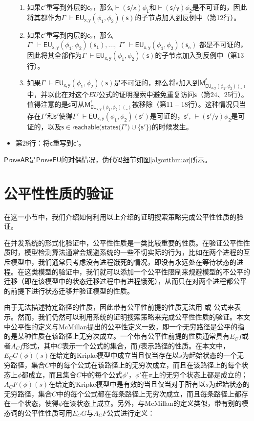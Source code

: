 \begin{itemize}
\begin{enumerate}
		\item 如果$\mathsf{c'}$重写到外层的$\mathsf{c_2}$，那么$\mathsf{\vdash (s/x)\phi_1}$和$\mathsf{\vdash (s/y)\phi_2}$是不可证的，因此将其都作为$\Gamma\;\mathsf{\vdash EU_{x,y}(\phi_1,\phi_2)(s)}$的子节点加入到反例中（第12行）。
		\item 如果$\mathsf{c'}$重写到内层的$\mathsf{c_2}$，那么$\Gamma'\;\mathsf{\vdash EU_{x,y}(\phi_1,\phi_2)(s_1)},...,\;\Gamma'\;\mathsf{\vdash EU_{x,y}(\phi_1,\phi_2)(s_n)}$ 都是不可证的，因此将其全部作为$\Gamma\;\mathsf{\vdash EU_{x,y}(\phi_1,\phi_2)(s)}$的子节点加入到反例中（第13行）。
		\item 如果$\Gamma\;\mathsf{\vdash EU_{x,y}(\phi_1,\phi_2)(s)}$是不可证的，那么将$s$加入到$\mathsf{M_{EU_{x,y}(\phi_1,\phi_2)(\_)}^f}$中，并以此在对这个$EU$公式的证明搜索中避免重复访问$\mathsf{s}$（第24、25行）。值得注意的是$\mathsf{s}$可从$\mathsf{M_{EU_{x,y}(\phi_1,\phi_2)(\_)}^f}$被移除（第11 -- 18行）。这种情况只当存在${\Gamma'}$和$\mathsf{s'}$使得$\Gamma'\;\mathsf{\vdash EU_{x,y}(\phi_1,\phi_2)(s')}$是可证的，$\mathsf{s'}$, $\mathsf{\vdash (s'/y)\phi_2}$是可证的，以及$\mathsf{s\in reachable(states(}\Gamma'\mathsf{)\cup \{s'\})}$的时候发生。
	\end{enumerate}
	\item 第28行：将$\mathsf{c}$重写到$\mathsf{c'}$。
\end{itemize}

$\mathsf{ProveAR}$是$\mathsf{ProveEU}$的对偶情况，伪代码细节如图\ref{algorithm:ar}所示。

\section{公平性性质的验证}
在这一小节中，我们介绍如何利用以上介绍的证明搜索策略完成公平性性质的验证。

在并发系统的形式化验证中，公平性性质是一类比较重要的性质。在验证公平性性质时，模型检测算法通常会规避系统的一些不切实际的行为\cite{BaierKatoen08}，比如在两个进程的互斥模型中，我们通常只考虑没有进程饿死的情况，即没有永远处在等待状态的进程。在这类模型的验证中，我们就可以添加一个公平性限制来规避模型的不公平的迁移（即在该模型中的状态迁移过程中有进程饿死），从而只在对两个进程都公平的前提下进行状态迁移并验证模型的性质。


由于无法描述特定路径的性质，因此带有公平性前提的性质无法用 \CTL{} 或 \CTLP{} 公式来表示。然而，我们仍然可以利用\SCTL{}系统的证明搜索策略来完成公平性性质的验证。本文中公平性的定义与McMillan提出的公平性定义\cite{mcmillan93}一致，即一个无穷路径是公平的指的是某种性质在该路径上无穷次成立。一个带有公平性前提的性质通常具有$E_Cf$或者$A_Cf$形式，其中$C$表示一个\CTLP{}公式的集合，而$f$表示路径的性质。在本文中，$E_CG(\phi)(s)$在给定的Kripke模型中成立当且仅当存在以$s$为起始状态的一个无穷路径，集合$C$中的每个公式在该路径上的无穷次成立，而且在该路径上的每个状态上$\phi$都成立，而且集合$C$中的每个公式$\phi'$，$\phi'$在$\pi$上的无穷个状态上都是成立的；$A_CF(\phi)(s)$在给定的Kripke模型中是有效的当且仅当对于所有以$s$为起始状态的无穷路径，集合$C$中的每个公式都在每条路径上无穷次成立，而且每条路径上都存在一个状态，使得$\phi$在该状态上成立。另外，与McMillan的定义类似，带有别的模态词的公平性性质可用$E_CG$与$A_CF$公式进行定义：


